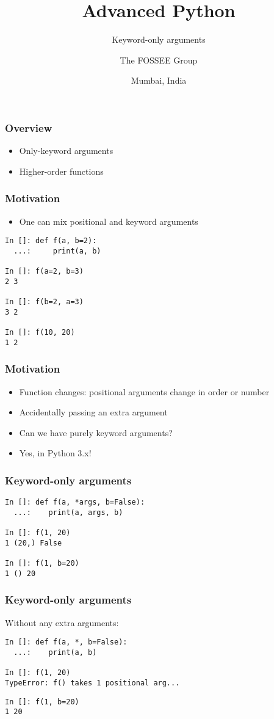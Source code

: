 \documentclass[14pt,compress]{beamer}
\title[only kwargs]{Advanced Python}
\subtitle{Keyword-only arguments}
\author[FOSSEE] {The FOSSEE Group}
\institute[IIT Bombay] {Department of Aerospace Engineering\\IIT Bombay}
\date[] {Mumbai, India}
\begin{document}
\begin{frame}
  \titlepage
\end{frame}

\begin{frame}
  \frametitle{Overview}
  \begin{itemize}
  \item Only-keyword arguments
  \item Higher-order functions
  \end{itemize}
\end{frame}

\begin{frame}[fragile]
  \frametitle{Motivation}
  \begin{itemize}
  \item One can mix positional and keyword arguments
  \end{itemize}
  \begin{lstlisting}
In []: def f(a, b=2):
  ...:     print(a, b)

In []: f(a=2, b=3)
2 3

In []: f(b=2, a=3)
3 2

In []: f(10, 20)
1 2
\end{lstlisting}
\end{frame}

\begin{frame}[fragile]
  \frametitle{Motivation}
  \begin{itemize}
  \item Function changes: positional arguments change in order or number
  \item Accidentally passing an extra argument
  \item Can we have purely keyword arguments?

    \vspace*{0.5in}
  \item Yes, in Python 3.x!
  \end{itemize}
\end{frame}

\begin{frame}[fragile]
  \frametitle{Keyword-only arguments}
  \begin{lstlisting}
In []: def f(a, *args, b=False):
  ...:    print(a, args, b)

In []: f(1, 20)
1 (20,) False

In []: f(1, b=20)
1 () 20
\end{lstlisting}
\end{frame}

\begin{frame}[fragile]
  \frametitle{Keyword-only arguments}
 \noindent Without any extra arguments:
\vspace*{0.25in}
  \begin{lstlisting}
In []: def f(a, *, b=False):
  ...:    print(a, b)

In []: f(1, 20)
TypeError: f() takes 1 positional arg...
\end{lstlisting}
\pause
  \begin{lstlisting}
In []: f(1, b=20)
1 20
  \end{lstlisting}
\end{frame}
\end{document}
